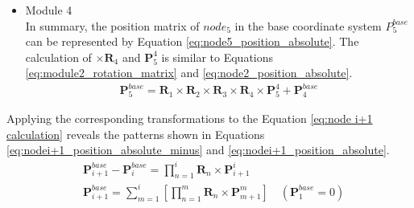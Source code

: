 \begin{itemize}
    \item Module 4 \\
    In summary, the position matrix of $node_5$ in the base coordinate system $P_5^{base}$can be represented by 
    Equation \ref{eq:node5_position_absolute}. The calculation of $\times\textbf{R}_{4}$ and $\textbf{P}_{5}^{4}$ 
    is similar to Equations \ref{eq:module2_rotation_matrix} and \ref{eq:node2_position_absolute}.
    \begin{align}
        \textbf{P}_{5}^{base} = \textbf{R}_{1} \times\textbf{R}_{2} \times\textbf{R}_{3} \times\textbf{R}_{4} 
        \times \textbf{P}_{5}^{4} + \textbf{P}_{4}^{base}
        \label{eq:node5_position_absolute}
    \end{align}
\end{itemize}
Applying the corresponding transformations to the Equation \ref{eq:node i+1 calculation} reveals the patterns shown 
in Equations \ref{eq:nodei+1_position_absolute_minus} and \ref{eq:nodei+1_position_absolute}.
\begin{align}
    &\textbf{P}_{i+1}^{base} - \textbf{P}_{i}^{base} = \prod_{n=1}^{i}\textbf{R}_{n}\times \textbf{P}_{i+1}^{i} 
    \label{eq:nodei+1_position_absolute_minus} \\
    &\textbf{P}_{i+1}^{base} = \sum_{m=1}^{i}\left[\prod_{n=1}^{m}\textbf{R}_{n}\times \textbf{P}_{m+1}^{m}\right] \quad(\textbf{P}_{1}^{base} = 0)
    \label{eq:nodei+1_position_absolute}
\end{align}
